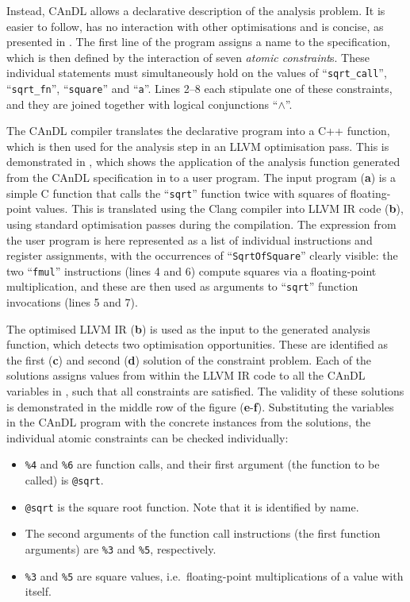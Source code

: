     Instead, CAnDL allows a declarative description of the analysis problem.
    It is easier to follow, has no interaction with other optimisations and
    is concise, as presented in .
    The first line of the program assigns a name to the specification, which is
    then defined by the interaction of seven {\em atomic constraint}s.
    These individual statements must simultaneously hold on the values of
    ``{\tt sqrt\_call}'', ``{\tt sqrt\_fn}'', ``{\tt square}'' and ``{\tt a}''.
    Lines 2--8 each stipulate one of these constraints, and they are joined
    together with logical conjunctions ``$\land$''.

    The CAnDL compiler translates the declarative program into a C++ function,
    which is then used for the analysis step in an LLVM optimisation pass.
    This is demonstrated in , which shows the application
    of the analysis function generated from the CAnDL specification in
     to a user program.
    The input program ({\bf a}) is a simple C function that calls the
    ``{\tt sqrt}'' function twice with squares of floating-point values.
    This is translated using the Clang compiler into LLVM IR code ({\bf b}),
    using standard optimisation passes during the compilation.
    The expression from the user program is here represented as a list of
    individual instructions and register assignments, with the occurrences
    of ``{\tt SqrtOfSquare}'' clearly visible: the two ``{\tt fmul}''
    instructions (lines 4 and 6) compute squares via a floating-point
    multiplication, and these are then used as arguments to ``{\tt sqrt}''
    function invocations (lines 5 and 7).

    The optimised LLVM IR ({\bf b}) is used as the input to the generated
    analysis function, which detects two optimisation opportunities.
    These are identified as the first ({\bf c}) and second ({\bf d}) solution
    of the constraint problem.
    Each of the solutions assigns values from within the LLVM IR code to
    all the CAnDL variables in , such
    that all constraints are satisfied.
    The validity of these solutions is demonstrated in the middle row of the
    figure ({\bf e}-{\bf f}).
    Substituting the variables in the CAnDL program with the concrete instances
    from the solutions, the individual atomic constraints can be checked
    individually:
    \begin{itemize}
    \item {\tt \%4} and {\tt \%6} are function calls, and their first argument
          (the function to be called) is {\tt @sqrt}.
    \item {\tt @sqrt} is the square root function.
          Note that it is identified by name.
    \item The second arguments of the function call instructions (the first
          function arguments) are {\tt \%3} and {\tt \%5}, respectively.
    \item {\tt \%3} and {\tt \%5} are square values, i.e.\ floating-point
          multiplications of a value with itself.
    \end{itemize}

